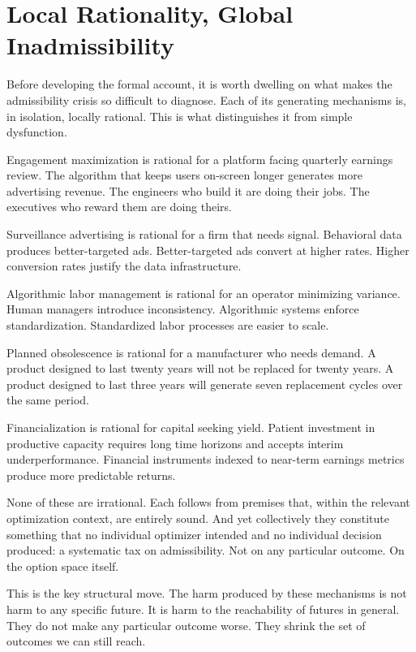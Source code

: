 \documentclass[11pt, letterpaper]{article}
\begin{document}
\section{Local Rationality, Global Inadmissibility}

Before developing the formal account, it is worth dwelling on what makes the admissibility crisis so difficult to diagnose. Each of its generating mechanisms is, in isolation, locally rational. This is what distinguishes it from simple dysfunction.

Engagement maximization is rational for a platform facing quarterly earnings review. The algorithm that keeps users on-screen longer generates more advertising revenue. The engineers who build it are doing their jobs. The executives who reward them are doing theirs.

Surveillance advertising is rational for a firm that needs signal. Behavioral data produces better-targeted ads. Better-targeted ads convert at higher rates. Higher conversion rates justify the data infrastructure.

Algorithmic labor management is rational for an operator minimizing variance. Human managers introduce inconsistency. Algorithmic systems enforce standardization. Standardized labor processes are easier to scale.

Planned obsolescence is rational for a manufacturer who needs demand. A product designed to last twenty years will not be replaced for twenty years. A product designed to last three years will generate seven replacement cycles over the same period.

Financialization is rational for capital seeking yield. Patient investment in productive capacity requires long time horizons and accepts interim underperformance. Financial instruments indexed to near-term earnings metrics produce more predictable returns.

None of these are irrational. Each follows from premises that, within the relevant optimization context, are entirely sound. And yet collectively they constitute something that no individual optimizer intended and no individual decision produced: a systematic tax on admissibility. Not on any particular outcome. On the option space itself.

This is the key structural move. The harm produced by these mechanisms is not harm to any specific future. It is harm to the reachability of futures in general. They do not make any particular outcome worse. They shrink the set of outcomes we can still reach.
\end{document}
